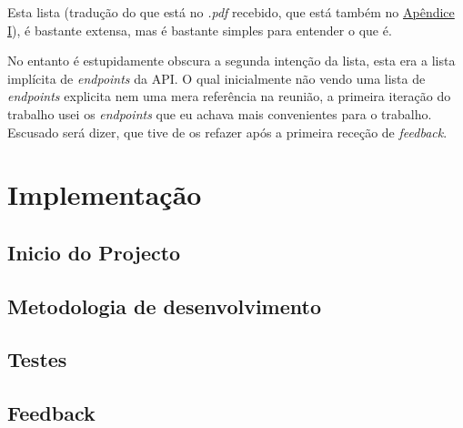 Esta lista (tradução do que está no \textit{.pdf} recebido, que está também no \hyperref[ap1]{Apêndice I}), é bastante extensa, mas é bastante simples para entender o que é.

No entanto é estupidamente obscura a segunda intenção da lista, esta era a lista implícita de \textit{endpoints} da API. O qual inicialmente não vendo uma lista de \textit{endpoints} explicita nem uma mera referência na reunião, a primeira iteração do trabalho usei os \textit{endpoints} que eu achava mais convenientes para o trabalho. Escusado será dizer, que tive de os refazer após a primeira receção de \textit{feedback}.

\newpage

\section{Implementação}

\subsection{Inicio do Projecto}

\lipsum

\subsection{Metodologia de desenvolvimento}

\lipsum

\subsection{Testes}

\lipsum

\subsection{Feedback}

\lipsum
